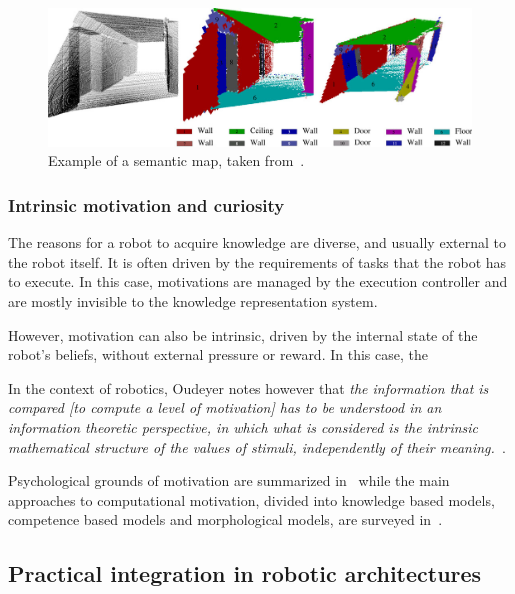 \documentclass[a4paper, twocolumn]{article}
\begin{document}
\begin{figure}
    \centering
    \includegraphics[width=0.9\columnwidth]{semanticmaps_hertzberg.png}
    \caption{Example of a semantic map, taken from~\cite{Nuechter2008}.}
    \label{fig|semanticmap}
\end{figure}

\subsubsection{Intrinsic motivation and curiosity}

The reasons for a robot to acquire knowledge are diverse, and usually external
to the robot itself. It is often driven by the requirements of tasks that the
robot has to execute. In this case, motivations are managed by the execution
controller and are mostly invisible to the knowledge representation system.

However, motivation can also be intrinsic, driven by the internal state of the
robot's beliefs, without external pressure or reward. In this case, the 

In the context of robotics, Oudeyer notes however that \emph{the information that is
compared \emph{[to compute a level of motivation]} has to be understood in an
information theoretic perspective, in which what is considered is the intrinsic
mathematical structure of the values of stimuli, independently of their
meaning.}~\cite{Oudeyer2007}.

Psychological grounds of motivation are summarized in~\cite{Oudeyer2007} while
the main approaches to computational motivation, divided into knowledge based
models, competence based models and morphological models, are surveyed
in~\cite{Oudeyer2008}.

\subsection{Practical integration in robotic architectures}
\label{sect|integration-robot}

\begin{scriptsize}
\begin{center}
\end{center}
\end{scriptsize}
\end{document}
